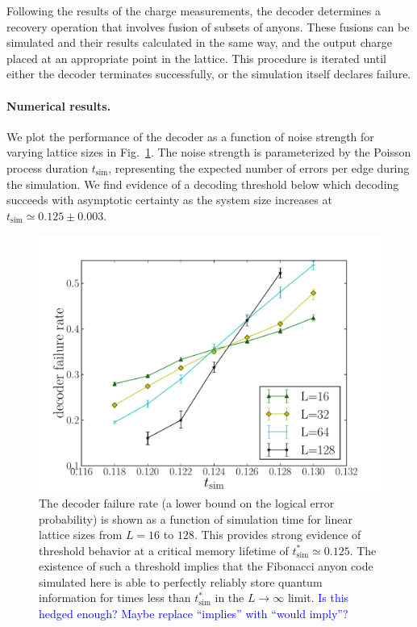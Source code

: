\documentclass[aps, prl, letterpaper, twocolumn, superscriptaddress, notitlepage, 10pt]{revtex4-1}
\newcommand{\Fref}[1]{Fig.~\ref{#1}}
\newcommand{\cggb}[1]{\textcolor{blue}{#1}}
\begin{document}
Following the results of the charge measurements, the decoder determines 
a recovery operation that involves fusion of subsets of anyons. 
These fusions can be simulated and their results calculated in the same way, 
and the output charge placed at an appropriate point in the lattice. 
This procedure is iterated until either the decoder terminates successfully, 
or the simulation itself declares failure.


\paragraph{Numerical results.}

We plot the performance of the decoder as a function of noise strength for varying lattice sizes in 
\Fref{f:threshold}. 
The noise strength is parameterized by the Poisson process duration $t_{\mathrm{sim}}$, representing the expected number of errors per edge during the simulation. 
We find evidence of a decoding threshold below which decoding succeeds with asymptotic 
certainty as the system size increases at $t_{\mathrm{sim}}\simeq 0.125 \pm 0.003$.

\begin{figure}[t!]
\begin{center}
	\includegraphics[width=\columnwidth]{anyons-kyle.pdf}
\caption{The decoder failure rate (a lower bound on the logical error probability) is shown as a function of simulation time for linear lattice sizes from $L=16$ to $128$. 
This provides strong evidence of threshold behavior at a critical memory lifetime of $t_{\mathrm{sim}}^*\simeq 0.125$. 
The existence of such a threshold implies that the Fibonacci anyon code simulated here is able to perfectly reliably store quantum information for times less than $t_{\mathrm{sim}}^*$ in the $L\to \infty$ limit. \cggb{Is this hedged enough? Maybe replace ``implies'' with ``would imply''?}}
\label{f:threshold}
\end{center}
\vspace{-10pt}
\end{figure}
\end{document}

